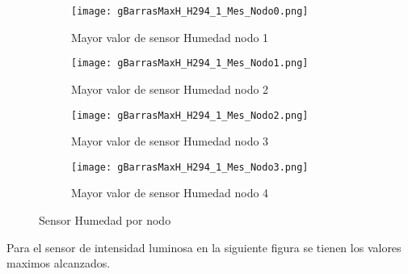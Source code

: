 \documentclass{article}
\begin{document}
        \begin{figure}[h!]
            \centering\begin{subfigure}[h]{0.42\linewidth}
                                    \texttt{[image: gBarrasMaxH\_H294\_1\_Mes\_Nodo0.png]}
                                    \caption{Mayor valor de sensor Humedad nodo 1}
                                    \label{fig:HumedadMax1}
                                \end{subfigure}
                                \begin{subfigure}[h]{0.42\linewidth}
                                    \texttt{[image: gBarrasMaxH\_H294\_1\_Mes\_Nodo1.png]}
                                    \caption{Mayor valor de sensor Humedad nodo 2}
                                    \label{fig:HumedadMax2}
                                \end{subfigure}
                                \begin{subfigure}[h]{0.42\linewidth}
                                    \texttt{[image: gBarrasMaxH\_H294\_1\_Mes\_Nodo2.png]}
                                    \caption{Mayor valor de sensor Humedad nodo 3}
                                    \label{fig:HumedadMax3}
                                \end{subfigure}
                                \begin{subfigure}[h]{0.42\linewidth}
                                    \texttt{[image: gBarrasMaxH\_H294\_1\_Mes\_Nodo3.png]}
                                    \caption{Mayor valor de sensor Humedad nodo 4}
                                    \label{fig:HumedadMax4}
                                \end{subfigure}
                                \caption{Sensor Humedad por nodo}
            \label{fig:fig5}
        \end{figure}
        \newpage
        Para el sensor de intensidad luminosa en la siguiente figura se tienen los valores maximos alcanzados.
\end{document}
